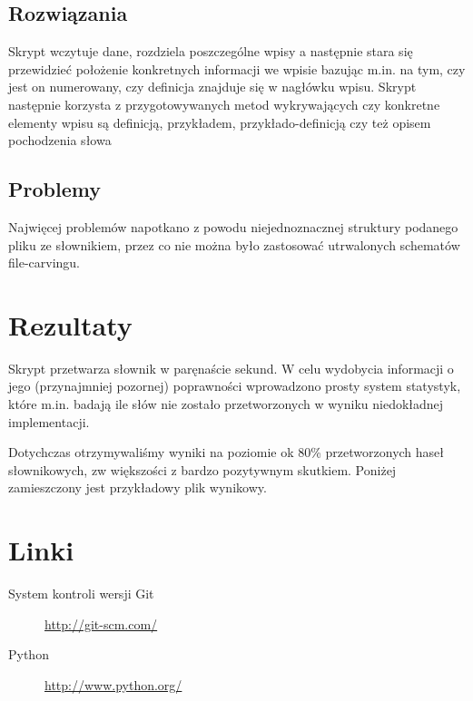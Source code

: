 \documentclass[12pt]{article}
\begin{document}
\subsection{Rozwiązania}
Skrypt wczytuje dane, rozdziela poszczególne wpisy a następnie stara się przewidzieć położenie konkretnych
informacji we wpisie bazując m.in. na tym, czy jest on numerowany, czy definicja znajduje się w 
nagłówku wpisu. 
Skrypt następnie korzysta z przygotowywanych metod wykrywających czy konkretne elementy wpisu są
definicją, przykładem, przykłado-definicją czy też opisem pochodzenia słowa

\subsection{Problemy}
Najwięcej problemów napotkano z powodu niejednoznacznej struktury podanego pliku ze słownikiem,
przez co nie można było zastosować utrwalonych schematów file-carvingu.

\section{Rezultaty}
Skrypt przetwarza słownik w paręnaście sekund. W celu wydobycia informacji o jego (przynajmniej
pozornej) poprawności wprowadzono prosty system statystyk, które m.in. badają ile słów nie zostało
przetworzonych w wyniku niedokładnej implementacji.

Dotychczas otrzymywaliśmy wyniki na poziomie ok 80\% przetworzonych haseł słownikowych, zw większości
z bardzo pozytywnym skutkiem. Poniżej zamieszczony jest przykładowy plik wynikowy.

\section{Linki}
\begin{description}
  \item[System kontroli wersji Git] \url{http://git-scm.com/}
  \item[Python] \url{http://www.python.org/}
\end{description}
\end{document}
